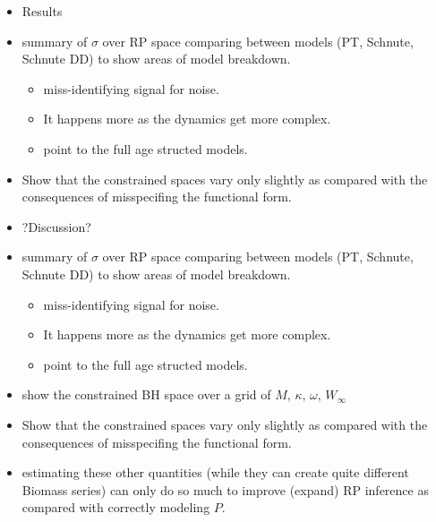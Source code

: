 \begin{itemize}
\begin{itemize}
	\end{itemize}
\item Results
	\item summary of $\sigma$ over RP space comparing between models (PT, Schnute, Schnute DD) to show areas of model breakdown.
		\begin{itemize}
		\item miss-identifying signal for noise. 
		\item It happens more as the dynamics get more complex. 
		\item point to the full age structed models.
		\end{itemize}
	\item Show that the constrained spaces vary only slightly as compared with the consequences 
of misspecifing the functional form. 
\item ?Discussion?
\end{itemize}

\begin{itemize}
\item summary of $\sigma$ over RP space comparing between models (PT, Schnute, Schnute DD) to show areas of model breakdown.
	\begin{itemize}
	\item miss-identifying signal for noise. 
	\item It happens more as the dynamics get more complex. 
	\item point to the full age structed models.
	\end{itemize}

\item show the constrained BH space over a grid of $M$, $\kappa$, $\omega$, $W_\infty$
\item Show that the constrained spaces vary only slightly as compared with the consequences 
of misspecifing the functional form. 
\item estimating these other quantities (while they can create quite different Biomass series) 
can only do so much to improve (expand) RP inference as compared with correctly modeling $P$. 
\end{itemize}

